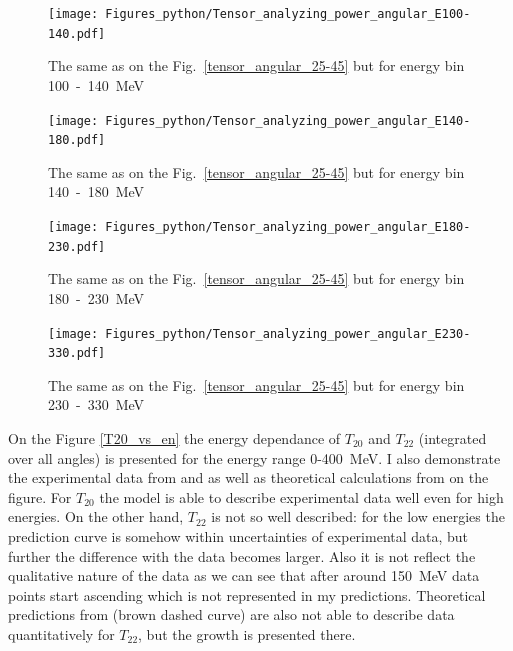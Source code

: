     \begin{figure}[h]
        \begin{center}
        \texttt{[image: Figures\_python/Tensor\_analyzing\_power\_angular\_E100-140.pdf]}
        \end{center}
        \caption{The same as on the Fig.~\ref*{tensor_angular_25-45} but for energy bin 100~-~140~MeV}
        \label{tensor_angular_100-140}
    \end{figure}
        
        

    \begin{figure}[h]
        \begin{center}
        \texttt{[image: Figures\_python/Tensor\_analyzing\_power\_angular\_E140-180.pdf]}
        \end{center}
        \caption{The same as on the Fig.~\ref*{tensor_angular_25-45} but for energy bin 140~-~180~MeV}
        \label{tensor_angular_140-180}
    \end{figure}
        

    \begin{figure}[h]
        \begin{center}
        \texttt{[image: Figures\_python/Tensor\_analyzing\_power\_angular\_E180-230.pdf]}
        \end{center}
        \caption{The same as on the Fig.~\ref*{tensor_angular_25-45} but for energy bin 180~-~230~MeV}
        \label{tensor_angular_180-230}
    \end{figure}

    \begin{figure}[h]
        \begin{center}
        \texttt{[image: Figures\_python/Tensor\_analyzing\_power\_angular\_E230-330.pdf]}
        \end{center}
        \caption{The same as on the Fig.~\ref*{tensor_angular_25-45} but for energy bin 230~-~330~MeV}
        \label{tensor_angular_230-330}
    \end{figure}
        


    On the Figure \ref{T20_vs_en} the energy dependance of $T_{20}$ and $T_{22}$
    (integrated over all angles)
    is presented for the energy range 0-400~MeV. I also demonstrate the experimental data from
    \cite{rachek2007} and \cite{mishev1993} as well as theoretical calculations from \cite{Schmitt1989}
    on the figure. For $T_{20}$ the model is able to describe experimental data well even for
    high energies. On the other hand, $T_{22}$ is not so well described: for the low 
    energies the prediction curve is somehow within uncertainties of experimental data,
    but further the difference with the data becomes larger. Also it is not 
    reflect the qualitative nature of the data as we can see that after around 150~MeV
    data points start ascending which is not represented in my predictions.
    Theoretical predictions from \cite{Schmitt1989} (brown dashed curve) are also not able
    to describe data quantitatively for $T_{22}$, but the growth is presented there. 


